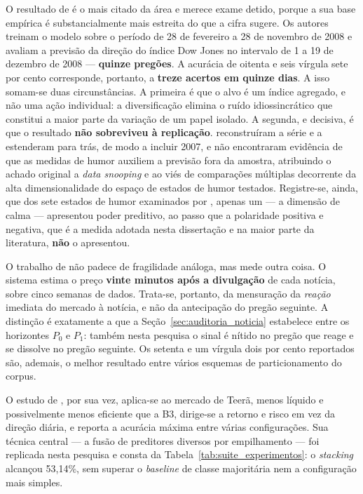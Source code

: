 O resultado de  é o mais citado da área e merece exame detido, porque a sua base empírica é substancialmente mais estreita do que a cifra sugere. Os autores treinam o modelo sobre o período de 28 de fevereiro a 28 de novembro de 2008 e avaliam a previsão da direção do índice Dow Jones no intervalo de 1 a 19 de dezembro de 2008 --- \textbf{quinze pregões}. A acurácia de oitenta e seis vírgula sete por cento corresponde, portanto, a \textbf{treze acertos em quinze dias}. A isso somam-se duas circunstâncias. A primeira é que o alvo é um índice agregado, e não uma ação individual: a diversificação elimina o ruído idiossincrático que constitui a maior parte da variação de um papel isolado. A segunda, e decisiva, é que o resultado \textbf{não sobreviveu à replicação}.  reconstruíram a série e a estenderam para trás, de modo a incluir 2007, e não encontraram evidência de que as medidas de humor auxiliem a previsão fora da amostra, atribuindo o achado original a \textit{data snooping} e ao viés de comparações múltiplas decorrente da alta dimensionalidade do espaço de estados de humor testados. Registre-se, ainda, que dos sete estados de humor examinados por , apenas um --- a dimensão de calma --- apresentou poder preditivo, ao passo que a polaridade positiva e negativa, que é a medida adotada nesta dissertação e na maior parte da literatura, \textbf{não} o apresentou.

O trabalho de  não padece de fragilidade análoga, mas mede outra coisa. O sistema estima o preço \textbf{vinte minutos após a divulgação} de cada notícia, sobre cinco semanas de dados. Trata-se, portanto, da mensuração da \emph{reação} imediata do mercado à notícia, e não da antecipação do pregão seguinte. A distinção é exatamente a que a Seção~\ref{sec:auditoria_noticia} estabelece entre os horizontes $P_0$ e $P_1$: também nesta pesquisa o sinal é nítido no pregão que reage e se dissolve no pregão seguinte. Os setenta e um vírgula dois por cento reportados são, ademais, o melhor resultado entre vários esquemas de particionamento do corpus.

O estudo de , por sua vez, aplica-se ao mercado de Teerã, menos líquido e possivelmente menos eficiente que a B3, dirige-se a retorno e risco em vez da direção diária, e reporta a acurácia máxima entre várias configurações. Sua técnica central --- a fusão de preditores diversos por empilhamento --- foi replicada nesta pesquisa e consta da Tabela~\ref{tab:suite_experimentos}: o \textit{stacking} alcançou 53,14\%, sem superar o \textit{baseline} de classe majoritária nem a configuração mais simples.

